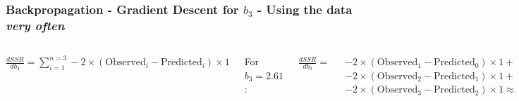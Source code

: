 \documentclass[aspectratio=169]{beamer}
\begin{document}
\begin{frame}[fragile]\frametitle{Backpropagation - Gradient Descent for $b_3$ - Using the data \textit{very often}}
\begin{columns}
    $\displaystyle \frac{d SSR}{d b_3} =   \sum_{i=1}^{n=3} -2 \times (\mathrm{Observed}_i - \mathrm{Predicted}_i)\times 1$

    \vspace{3mm}
 
    For $b_3=2.61$:
    
    \vspace{3mm}
    
    $\displaystyle \frac{d SSR}{d b_3} = $
    
    $-2 \times (\mathrm{Observed}_1 - \mathrm{Predicted}_0)\times 1 +$
    $-2 \times (\mathrm{Observed}_2 - \mathrm{Predicted}_1)\times 1 +$
    $-2 \times (\mathrm{Observed}_3 - \mathrm{Predicted}_2)\times 1 \approx$
    \vspace{3mm}

    $-2 \times (0 - 0.01)\times 1 +$
    $-2 \times (1 - 1.01)\times 1 +$
    $-2 \times (0 - 0)\times 1 \approx 0$
    \vspace{3mm}

    $\mathrm{Step Size} = 0.1 \times 0 = 0$ (Learning Rate = 0.1)
    $\mathrm{New } b_3 = b_3 - \mathrm{Step Size} = \textbf{2.61}$
    

\end{columns}
\end{frame}
\end{document}
